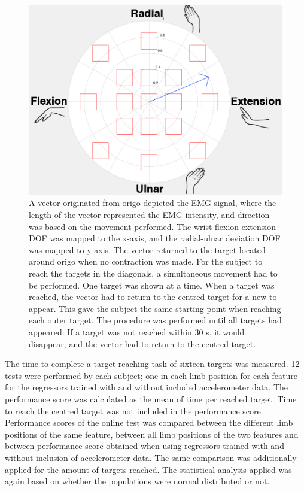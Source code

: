 \documentclass[a4paper, 10pt, conference]{ieeeconf}      %
\begin{document}
\begin{figure}[thpb]
	\centering
	\includegraphics[scale=0.25]{Figures/Target}
	\caption{A vector originated from origo depicted the EMG signal, where the length of the vector represented the EMG intensity, and direction was based on the movement performed. The wrist flexion-extension DOF was mapped to the x-axis, and the radial-ulnar deviation DOF was mapped to y-axis. The vector returned to the target located around origo when no contraction was made. For the subject to reach the targets in the diagonals, a simultaneous movement had to be performed. One target was shown at a time. When a target was reached, the vector had to return to the centred target for a new to appear. This gave the subject the same starting point when reaching each outer target. The procedure was performed until all targets had appeared. If a target was not reached within 30 s, it would disappear, and the vector had to return to the centred target.}
	\label{fig:targets}
\end{figure}

The time to complete a target-reaching task of sixteen targets was measured. 12 tests were performed by each subject; one in each limb position for each feature for the regressors trained with and without included accelerometer data. The performance score was calculated as the mean of time per reached target. Time to reach the centred target was not included in the performance score. Performance scores of the online test was compared between the different limb positions of the same feature, between all limb positions of the two features and between performance score obtained when using regressors trained with and without inclusion of accelerometer data. The same comparison was additionally applied for the amount of targets reached. The statistical analysis applied was again based on whether the populations were normal distributed or not. 		
	
\end{document}
